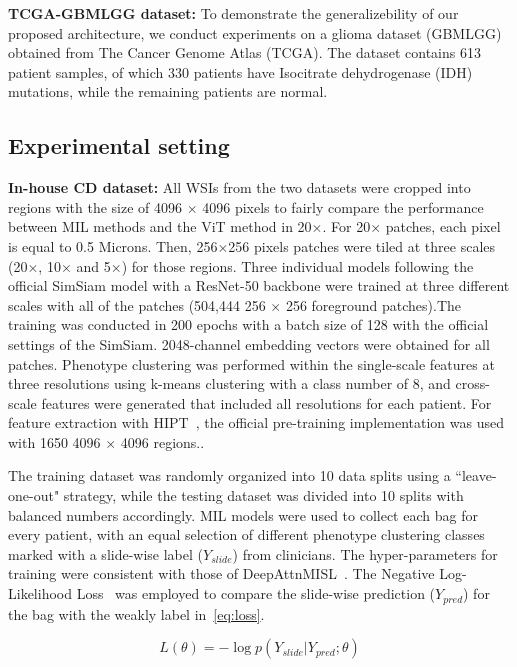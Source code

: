 \documentclass[times,twocolumn,final]{elsarticle}
\begin{document}
\textbf{TCGA-GBMLGG dataset:} To demonstrate the generalizebility of our proposed architecture, we conduct experiments on a glioma dataset (GBMLGG) obtained from The Cancer Genome Atlas (TCGA). The dataset contains 613 patient samples, of which 330 patients have Isocitrate dehydrogenase (IDH) mutations, while the remaining patients are normal.


\subsection{Experimental setting}
\textbf{In-house CD dataset:} All WSIs from the two datasets were cropped into regions with the size of 4096 $\times$ 4096 pixels to fairly compare the performance between MIL methods and the ViT method in 20$\times$. For 20$\times$ patches, each pixel is equal to 0.5 Microns. Then, 256$\times$256 pixels patches were tiled at three scales (20$\times$, 10$\times$ and 5$\times$) for those regions. Three individual models following the official SimSiam model with a ResNet-50 backbone were trained at three different scales with all of the patches (504,444 256 $\times$ 256 foreground patches).The training was conducted in 200 epochs with a batch size of 128 with the official settings of the SimSiam. 2048-channel embedding vectors were obtained for all patches. Phenotype clustering was performed within the single-scale features at three resolutions using k-means clustering with a class number of 8, and cross-scale features were generated that included all resolutions for each patient. For feature extraction with HIPT~\citep{chen2022scaling}, the official pre-training implementation was used with 1650 4096 $\times$ 4096 regions..

The training dataset was randomly organized into 10 data splits using a ``leave-one-out" strategy, while the testing dataset was divided into 10 splits with balanced numbers accordingly. MIL models were used to collect each bag for every patient, with an equal selection of different phenotype clustering classes marked with a slide-wise label ($Y_{slide}$) from clinicians. The hyper-parameters for training were consistent with those of DeepAttnMISL~\citep{yao2020whole}. The Negative Log-Likelihood Loss~\citep{yao2019negative} was employed to compare the slide-wise prediction ($Y_{pred}$) for the bag with the weakly label in~\ref{eq:loss}. 

\begin{equation}
    L(\theta) = -\log p(Y_{slide}|Y_{pred};\theta)
\label{eq:loss}
\end{equation}
\end{document}

